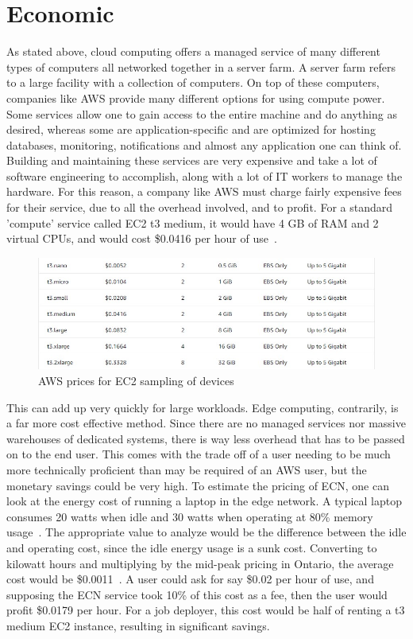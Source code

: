 \documentclass[../mthe-493-final-project.tex]{subfiles}
\begin{document}
    \section{Economic}
    \label{sec:economic}
     As stated above, cloud computing offers a managed service of many different types of computers all networked together in a server farm. A server farm refers to a large facility with a collection of computers. On top of these computers, companies like AWS provide many different options for using compute power. Some services allow one to gain access to the entire machine and do anything as desired, whereas some are application-specific and are optimized for hosting databases, monitoring, notifications and almost any application one can think of. Building and maintaining these services are very expensive and take a lot of software engineering to accomplish, along with a lot of IT workers to manage the hardware. For this reason, a company like AWS must charge fairly expensive fees for their service, due to all the overhead involved, and to profit. For a standard 'compute' service called EC2 t3 medium, it would have 4 GB of RAM and 2 virtual CPUs, and would cost \$0.0416 per hour of use~\cite{ec2-pricing}.
     \begin{figure}
        \centering
        \includegraphics{thesis/img/aws_ec2_pricing.jpg}
        \caption{AWS prices for EC2 sampling of devices}
        \label{fig:ec2-pricing-fig}
    \end{figure}
     This can add up very quickly for large workloads. Edge computing, contrarily, is a far more cost effective method. Since there are no managed services nor massive warehouses of dedicated systems, there is way less overhead that has to be passed on to the end user. This comes with the trade off of a user needing to be much more technically proficient than may be required of an AWS user, but the monetary savings could be very high. To estimate the pricing of ECN, one can look at the energy cost of running a laptop in the edge network. A typical laptop consumes 20 watts when idle and 30 watts when operating at 80\% memory usage~\cite{laptop-energy-consumption-estimate}. The appropriate value to analyze would be the difference between the idle and operating cost, since the idle energy usage is a sunk cost. Converting to kilowatt hours and multiplying by the mid-peak pricing in Ontario, the average cost would be \$0.0011~\cite{ontario-energy-rates}. A user could ask for say \$0.02 per hour of use, and supposing the ECN service took 10\% of this cost as a fee, then the user would profit \$0.0179 per hour. For a job deployer, this cost would be half of renting a t3 medium EC2 instance, resulting in significant savings. 
    
\end{document}
